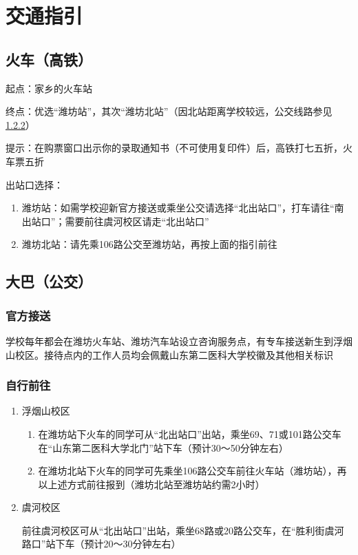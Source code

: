 
\section[交通指引]{交通指引}
\label{goto_school}
\subsection[火车（高铁）]{火车（高铁）}
起点：家乡的火车站

终点：优选“潍坊站”，其次“潍坊北站”（因北站距离学校较远，公交线路参见\uline{\ref{bus}}）

提示：在购票窗口出示你的录取通知书（不可使用复印件）后，高铁打七五折，火车票五折

出站口选择：
\begin{enumerate}
    \item 潍坊站：如需学校迎新官方接送或乘坐公交请选择“北出站口”，打车请往“南出站口”；需要前往虞河校区请走“北出站口”
    \item 潍坊北站：请先乘106路公交至潍坊站，再按上面的指引前往
\end{enumerate}

\subsection[大巴（公交）]{大巴（公交）}

\subsubsection[官方接送]{官方接送}
学校每年都会在潍坊火车站、潍坊汽车站设立咨询服务点，有专车接送新生到浮烟山校区。接待点内的工作人员均会佩戴山东第二医科大学校徽及其他相关标识

\subsubsection[自行前往]{自行前往}
\label{bus}
\begin{enumerate}
    \item 浮烟山校区
          \begin{enumerate}
              \item 在潍坊站下火车的同学可从“北出站口”出站，乘坐69、71或101路公交车在“山东第二医科大学北门”站下车（预计30～50分钟左右）
              \item 在潍坊北站下火车的同学可先乘坐106路公交车前往火车站（潍坊站），再以上述方式前往报到（潍坊北站至潍坊站约需2小时）
          \end{enumerate}
    \item 虞河校区

          前往虞河校区可从“北出站口”出站，乘坐68路或20路公交车，在“胜利街虞河路口”站下车（预计20～30分钟左右）
\end{enumerate}

